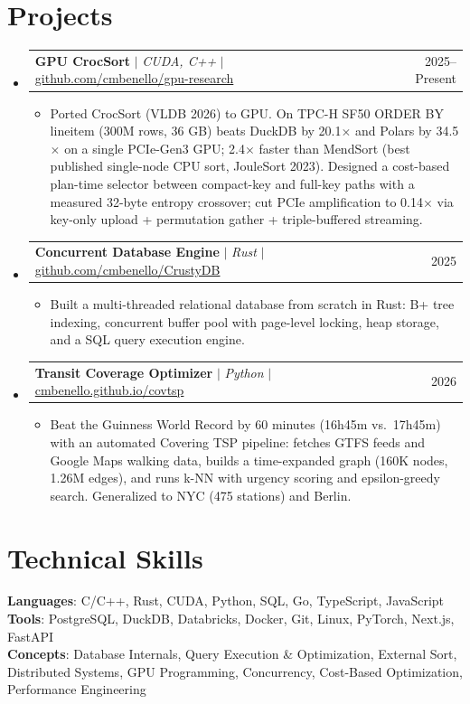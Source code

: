 \documentclass[letterpaper,10pt]{article}
\makeatletter
\newcommand{\resumeItem}[1]{
  \item\small{
    {#1 \vspace{-3pt}}
  }
}
\newcommand{\resumeProjectHeading}[2]{
    \item
    \begin{tabular*}{0.99\textwidth}{l@{\extracolsep{\fill}}r}
      \small#1 & #2 \\
    \end{tabular*}\vspace{-8pt}
}
\newcommand{\resumeSubHeadingListStart}{\begin{itemize}[leftmargin=0.015in, label={}]}
\newcommand{\resumeSubHeadingListEnd}{\end{itemize}}
\newcommand{\resumeItemListStart}{\begin{itemize}[leftmargin=0.15in]}
\newcommand{\resumeItemListEnd}{\end{itemize}\vspace{-7pt}}
\makeatother
\begin{document}
\section{Projects}
    \resumeSubHeadingListStart
      \resumeProjectHeading
          {\textbf{GPU CrocSort} $|$ \emph{CUDA, C++} $|$ \small{\href{https://github.com/cmbenello/gpu-research}{github.com/cmbenello/gpu-research}}}{2025--Present}
          \resumeItemListStart
            \resumeItem{Ported CrocSort (VLDB 2026) to GPU. On TPC-H SF50 ORDER BY lineitem (300M rows, 36 GB) beats DuckDB by 20.1$\times$ and Polars by 34.5$\times$ on a single PCIe-Gen3 GPU; 2.4$\times$ faster than MendSort (best published single-node CPU sort, JouleSort 2023). Designed a cost-based plan-time selector between compact-key and full-key paths with a measured 32-byte entropy crossover; cut PCIe amplification to 0.14$\times$ via key-only upload + permutation gather + triple-buffered streaming.}
          \resumeItemListEnd
      \resumeProjectHeading
          {\textbf{Concurrent Database Engine} $|$ \emph{Rust} $|$ \small{\href{https://github.com/cmbenello/CrustyDB}{github.com/cmbenello/CrustyDB}}}{2025}
          \resumeItemListStart
            \resumeItem{Built a multi-threaded relational database from scratch in Rust: B+ tree indexing, concurrent buffer pool with page-level locking, heap storage, and a SQL query execution engine.}
          \resumeItemListEnd
      \resumeProjectHeading
          {\textbf{Transit Coverage Optimizer} $|$ \emph{Python} $|$ \small{\href{https://cmbenello.github.io/covtsp}{cmbenello.github.io/covtsp}}}{2026}
          \resumeItemListStart
            \resumeItem{Beat the Guinness World Record by 60 minutes (16h45m vs.\ 17h45m) with an automated Covering TSP pipeline: fetches GTFS feeds and Google Maps walking data, builds a time-expanded graph (160K nodes, 1.26M edges), and runs k-NN with urgency scoring and epsilon-greedy search. Generalized to NYC (475 stations) and Berlin.}
          \resumeItemListEnd
    \resumeSubHeadingListEnd

\section{Technical Skills}
 \begin{itemize}[leftmargin=0.015in, label={}]
    \small{\item{
     \textbf{Languages}{: C/C++, Rust, CUDA, Python, SQL, Go, TypeScript, JavaScript} \\
     \textbf{Tools}{: PostgreSQL, DuckDB, Databricks, Docker, Git, Linux, PyTorch, Next.js, FastAPI} \\
     \textbf{Concepts}{: Database Internals, Query Execution \& Optimization, External Sort, Distributed Systems, GPU Programming, Concurrency, Cost-Based Optimization, Performance Engineering}
    }}
 \end{itemize}\vspace{-9pt}
\end{document}
